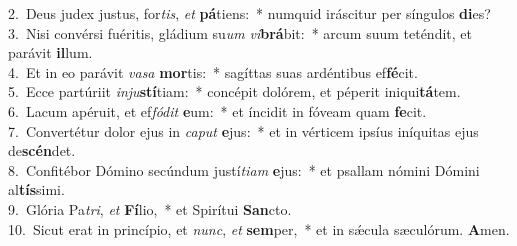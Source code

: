 {2.~}Deus judex justus, for\textit{tis}, \textit{et} \textbf{pá}tiens:~* numquid iráscitur per síngulos \textbf{di}es?\\
{3.~}Nisi convérsi fuéritis, gládium su\textit{um} \textit{vi}\textbf{brá}bit:~* arcum suum teténdit, et parávit \textbf{il}lum.\\
{4.~}Et in eo parávit \textit{va}\textit{sa} \textbf{mor}tis:~* sagíttas suas ardéntibus ef\textbf{fé}cit.\\
{5.~}Ecce partúriit \textit{in}\textit{ju}\textbf{stí}tiam:~* concépit dolórem, et péperit iniqui\textbf{tá}tem.\\
{6.~}Lacum apéruit, et ef\textit{fó}\textit{dit} \textbf{e}um:~* et íncidit in fóveam quam \textbf{fe}cit.\\
{7.~}Convertétur dolor ejus in \textit{ca}\textit{put} \textbf{e}jus:~* et in vérticem ipsíus iníquitas ejus de\textbf{scén}det.\\
{8.~}Confitébor Dómino secúndum justí\textit{ti}\textit{am} \textbf{e}jus:~* et psallam nómini Dómini al\textbf{tís}simi.\\
{9.~}Glória Pa\textit{tri}, \textit{et} \textbf{Fí}lio,~* et Spirítui \textbf{San}cto.\\
{10.~}Sicut erat in princípio, et \textit{nunc}, \textit{et} \textbf{sem}per,~* et in sǽcula sæculórum. \textbf{A}men.\\
